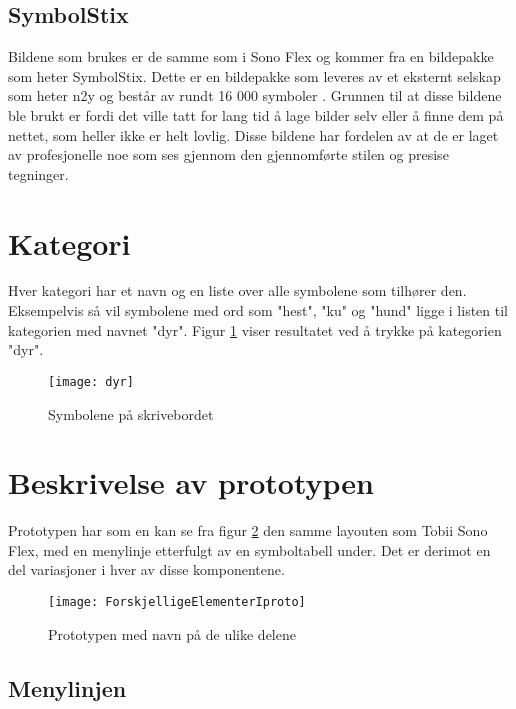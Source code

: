 \subsection{SymbolStix}

Bildene som brukes er de samme som i Sono Flex og kommer fra en bildepakke som heter SymbolStix. Dette er en bildepakke som leveres av et eksternt selskap som heter n2y og består av rundt 16 000 symboler \cite{n2y}. Grunnen til at disse bildene ble brukt er fordi det ville tatt for lang tid å lage bilder selv eller å finne dem på nettet, som heller ikke er helt lovlig. Disse bildene har fordelen av at de er laget av profesjonelle noe som ses gjennom den gjennomførte stilen og presise tegninger.


\section{Kategori}

Hver kategori har et navn og en liste over alle symbolene som tilhører den. Eksempelvis så vil symbolene med ord som "hest", "ku" og "hund" ligge i listen til kategorien med navnet "dyr". Figur \ref{fig:katego} viser resultatet ved å trykke på kategorien "dyr". 

\begin{figure}[ht!] 
\centering 
\texttt{[image: dyr]} 
\caption{Symbolene på skrivebordet} 
\label{fig:katego} 
\end{figure} 



 
\section{Beskrivelse av prototypen} 

Prototypen har som en kan se fra figur \ref{fig:protooo} den samme layouten som Tobii Sono Flex, med en menylinje etterfulgt av en symboltabell under. Det er derimot en del variasjoner i hver av disse komponentene.  

\begin{figure}[ht!] 
\centering 
\texttt{[image: ForskjelligeElementerIproto]} 
\caption{Prototypen med navn på de ulike delene} 
\label{fig:protooo} 
\end{figure} 


\subsection{Menylinjen} 
 

